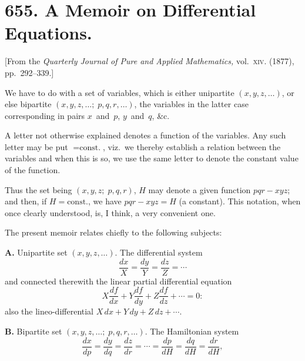 \documentclass[12pt,a4paper]{article}
\theoremstyle{plain}
\begin{document}
\newpage

\section*{655. A Memoir on Differential Equations.}

\begin{center}
[From the \textit{Quarterly Journal of Pure and Applied Mathematics,} vol.~\textsc{xiv}. (1877), pp.~292--339.]
\end{center}

\setcounter{page}{113}

We have to do with a set of variables, which is either unipartite $(x, y, z, \ldots)$, or else bipartite $(x, y, z, \ldots;\; p, q, r, \ldots)$, the variables in the latter case corresponding in pairs $x$~and~$p$, $y$~and~$q$, \&c.

A letter not otherwise explained denotes a function of the variables. Any such letter may be put $= \text{const.}$, viz.~we thereby establish a relation between the variables and when this is so, we use the same letter to denote the constant value of the function.

Thus the set being $(x, y, z;\; p, q, r)$, $H$ may denote a given function $pqr - xyz$; and then, if $H = \text{const.}$, we have $pqr - xyz = H$ (a constant). This notation, when once clearly understood, is, I think, a very convenient one.

The present memoir relates chiefly to the following subjects:

\textbf{A.} Unipartite set $(x, y, z, \ldots)$. The differential system
\[
\frac{dx}{X} = \frac{dy}{Y} = \frac{dz}{Z} = \cdots
\]
and connected therewith the linear partial differential equation
\[
X\frac{df}{dx} + Y\frac{df}{dy} + Z\frac{df}{dz} + \cdots = 0:
\]
also the lineo-differential $X\,dx + Y\,dy + Z\,dz + \cdots$.

\textbf{B.} Bipartite set $(x, y, z, \ldots;\; p, q, r, \ldots)$. The Hamiltonian system
\[
\frac{dx}{dp} = \frac{dy}{dq} = \frac{dz}{dr} = \cdots = \frac{dp}{dH} = \frac{dq}{dH} = \frac{dr}{dH},
\]
\end{document}
